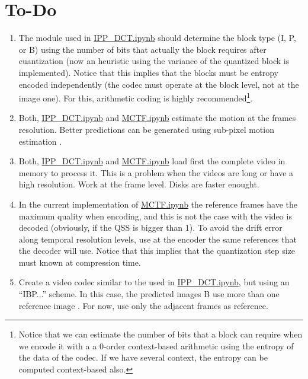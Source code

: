 \section{To-Do}

\begin{enumerate}
  
\item The module used in
  \href{https://github.com/Sistemas-Multimedia/VCF/blob/main/notebooks/IPP_DCT.ipynb}{IPP\_DCT.ipynb}
  should determine the block type (I, P, or B) using the number of
  bits that actually the block requires after cuantization (now an
  heuristic using the variance of the quantized block is
  implemented). Notice that this implies that the blocks must be
  entropy encoded independently (the codec must operate at the block
  level, not at the image one). For this, arithmetic coding is highly
  recommended\footnote{Notice that we can estimate the number of bits
  that a block can require when we encode it with a a 0-order
  context-based arithmetic using the entropy of the data of the
  codec. If we have several context, the entropy can be computed
  context-based also.}.

\item Both,
  \href{https://github.com/Sistemas-Multimedia/VCF/blob/main/notebooks/IPP_DCT.ipynb}{IPP\_DCT.ipynb}
  and
  \href{https://github.com/Sistemas-Multimedia/VCF/blob/main/notebooks/MCTF.ipynb}{MCTF.ipynb}
  estimate the motion at the frames resolution. Better predictions can
  be generated using sub-pixel motion estimation \cite{timoner2000subpixel,farneback02}.

\item Both,
  \href{https://github.com/Sistemas-Multimedia/VCF/blob/main/notebooks/IPP_DCT.ipynb}{IPP\_DCT.ipynb}
  and
  \href{https://github.com/Sistemas-Multimedia/VCF/blob/main/notebooks/MCTF.ipynb}{MCTF.ipynb}
  load first the complete video in memory to process it. This is a
  problem when the videos are long or have a high resolution. Work at
  the frame level. Disks are faster enought.

\item In the current implementation of
  \href{https://github.com/Sistemas-Multimedia/VCF/blob/main/notebooks/MCTF.ipynb}{MCTF.ipynb}
  the reference frames have the maximum quality when encoding, and
  this is not the case with the video is decoded (obviously, if the
  QSS is bigger than 1). To avoid the drift error along temporal
  resolution levels, use at the encoder the same references that the
  decoder will use. Notice that this implies that the quantization
  step size must known at compression time.
  
\item Create a video codec similar to the used in
  \href{https://github.com/Sistemas-Multimedia/VCF/blob/main/notebooks/IPP_DCT.ipynb}{IPP\_DCT.ipynb},
  but using an ``IBP...'' scheme. In this case, the predicted images B
  use more than one reference image \cite{vruiz__ME,vruiz__MC}. For
  now, use only the adjacent frames as reference.
  
\end{enumerate}

